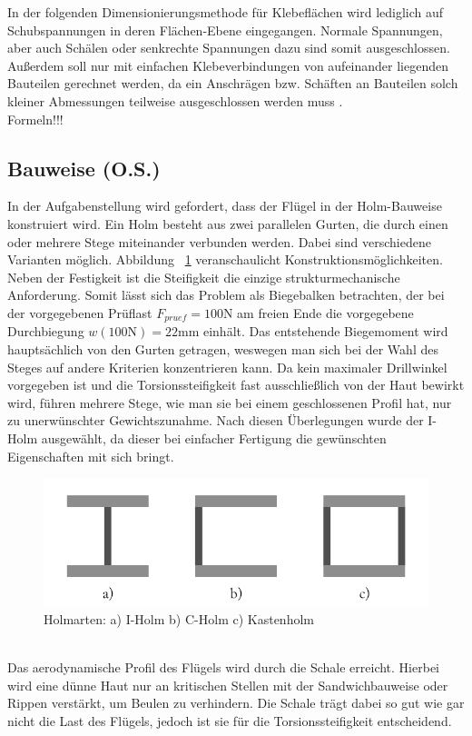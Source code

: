 \noindent In der folgenden Dimensionierungsmethode für Klebeflächen wird lediglich auf Schubspannungen in deren Flächen-Ebene eingegangen. Normale Spannungen, aber auch Schälen oder senkrechte Spannungen dazu sind somit ausgeschlossen. Außerdem soll nur mit einfachen Klebeverbindungen von aufeinander liegenden Bauteilen gerechnet werden, da ein Anschrägen bzw. Schäften an Bauteilen solch kleiner Abmessungen teilweise ausgeschlossen werden muss \cite{item23}.\\

Formeln!!!

\newpage
\subsection{Bauweise (O.S.)}
In der Aufgabenstellung wird gefordert, dass der Flügel in der Holm-Bauweise konstruiert wird. Ein Holm besteht aus zwei parallelen Gurten, die durch einen oder mehrere Stege miteinander verbunden werden. Dabei sind verschiedene Varianten möglich. Abbildung ~\ref{fig: Holmarten} veranschaulicht Konstruktionsmöglichkeiten. Neben der Festigkeit ist die Steifigkeit die einzige strukturmechanische Anforderung. Somit lässt sich das Problem als Biegebalken betrachten, der bei der vorgegebenen Prüflast $ F_{pruef}=100\mathrm{N} $ am freien Ende die vorgegebene Durchbiegung $ w(100\mathrm{N})=22\mathrm{mm} $ einhält. Das entstehende Biegemoment wird hauptsächlich von den Gurten getragen, weswegen man sich bei der Wahl des Steges auf andere Kriterien konzentrieren kann. Da kein maximaler Drillwinkel vorgegeben ist und die Torsionssteifigkeit fast ausschließlich von der Haut bewirkt wird, führen mehrere Stege, wie man sie bei einem geschlossenen Profil hat, nur zu unerwünschter Gewichtszunahme. Nach diesen Überlegungen wurde der I-Holm ausgewählt, da dieser bei einfacher Fertigung die gewünschten Eigenschaften mit sich bringt.
\begin{figure}[h]
	\includegraphics[width=1.0\textwidth]{Bilder/Holmarten.png}
	\caption{Holmarten: a) I-Holm   b) C-Holm    c) Kastenholm}
	\label{fig: Holmarten}
\end{figure}\\ 
\noindent
Das aerodynamische Profil des Flügels wird durch die Schale erreicht. Hierbei wird eine dünne Haut nur an kritischen Stellen mit der Sandwichbauweise oder Rippen verstärkt, um Beulen zu verhindern. Die Schale trägt dabei so gut wie gar nicht die Last des Flügels, jedoch ist sie für die Torsionssteifigkeit entscheidend.
\FloatBarrier
